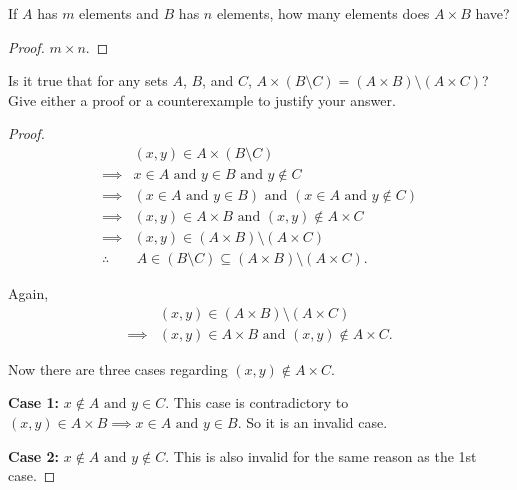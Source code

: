 \documentclass[12pt]{article}
\newenvironment{exercise}[2][Exercise]{\begin{trivlist}
\item[\hskip \labelsep {\bfseries #1}\hskip \labelsep {\bfseries #2.}]}{\end{trivlist}}
\newcommand{\nd}{\text{ and }}
\begin{document}
\begin{exercise}
	{7}
	If \( A \) has \( m \) elements and \( B \) has \( n \) elements, how many elements does \( A\times B \) have?
\end{exercise}

\begin{proof}
	\( m\times n \).
\end{proof}

\begin{exercise}
	{8}
	Is it true that for any sets \( A \), \( B \), and \( C \), \( A \times (B \setminus C) = (A \times B) \setminus (A \times C) \)?
	Give either a proof or a counterexample to justify your answer.
\end{exercise}

\begin{proof}
	\begin{align*}
		           & (x,y) \in A\times (B \setminus C)                                 \\
		\implies   & x \in A \nd y \in B \nd y \notin C                                \\
		\implies   & (x \in A \nd y \in B) \nd (x \in A \nd y \notin C)                \\
		\implies   & (x,y) \in A\times B \nd (x,y) \notin A\times C                    \\
		\implies   & (x,y) \in (A\times B)\setminus (A\times C)                        \\
		\therefore & \ A \in (B\setminus C)\subseteq (A\times B)\setminus (A\times C).
	\end{align*}

	Again,
	\begin{align*}
		         & (x,y) \in (A\times B)\setminus (A\times C)      \\
		\implies & (x,y) \in A\times B \nd (x,y) \notin A\times C.
	\end{align*}

	Now there are three cases regarding \( (x,y)\notin A\times C \).

	\textbf{Case 1:} \( x\notin A \nd y \in C \). This case is contradictory to \( (x,y) \in A\times B \implies x \in A \nd y \in B \). So it is an invalid case.

	\textbf{Case 2:} \( x \notin A \nd y \notin C \). This is also invalid for the same reason as the 1st case.


\end{proof}
\end{document}

